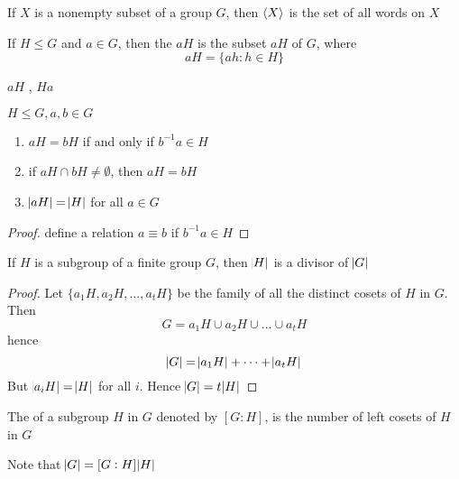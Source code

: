 \documentclass[11pt]{article}
\begin{document}
\begin{proposition}[]
If \(X\) is a nonempty subset of a group \(G\), then \(\langle X\rangle\) is the set of all
words on \(X\)
\end{proposition}


\begin{definition}[]
If \(H\le G\) and \(a\in G\), then the  \(aH\) is the subset \(aH\) of \(G\),
where
\begin{equation*}
aH=\{ah:h\in H\}
\end{equation*}
\end{definition}
\(aH\) , \(Ha\) 

\begin{lemma}[]
\(H\le G,a,b\in G\)
\begin{enumerate}
\item \(aH=bH\) if and only if \(b^{-1}a\in H\)
\item if \(aH\cap bH\neq\emptyset\), then \(aH=bH\)
\item \(\abs{aH}=\abs{H}\) for all \(a\in G\)
\end{enumerate}
\end{lemma}
\begin{proof}
define a relation \(a\equiv b\) if \(b^{-1}a\in H\)
\end{proof}


\begin{theorem}
If \(H\) is a subgroup of a finite group \(G\), then \(\abs{H}\) is a divisor of \(\abs{G}\)
\end{theorem}

\begin{proof}
Let \(\{a_1H,a_2H,\dots,a_tH\}\) be the family of all the distinct cosets of
\(H\) in \(G\). Then
\begin{equation*}
G=a_1H\cup a_2H\cup\dots\cup a_tH
\end{equation*}
hence
\begin{equation*}
\abs{G}=\abs{a_1H}+\dots+\abs{a_tH}
\end{equation*}
But \(\abs{a_iH}=\abs{H}\) for all \(i\). Hence \(\abs{G}=t\abs{H}\)
\end{proof}

\begin{definition}[]
The  of a subgroup \(H\) in \(G\) denoted by \([G:H]\), is the number of
left cosets of \(H\) in \(G\)
\end{definition}

Note that \(\abs{G}=[G:H]\abs{H}\)
\end{document}
